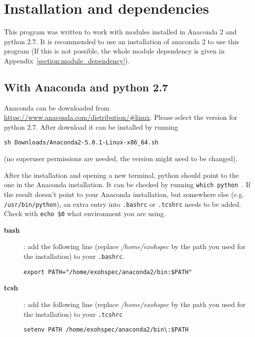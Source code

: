 \documentclass[10pt,a4paper]{article}
\begin{document}


\newpage
\section{Installation and dependencies}
\label{Section:installation}

\noindent This program was written to work with modules installed in Anaconda 2 and python 2.7. It is recommended to use an installation of anaconda 2 to use this program (If this is not possible, the whole module dependency is given in Appendix~\ref{section:module_dependency}).



\subsection{With Anaconda and python 2.7}

\noindent Anaconda can be downloaded from \url{https://www.anaconda.com/distribution/#linux}. Please select the version for python 2.7. After download it can be installed by running
\begin{lstlisting}[style=base]
sh Downloads/Anaconda2-5.0.1-Linux-x86_64.sh
\end{lstlisting}
(no superuser permissions are needed, the version might need to be changed).

After the installation and opening a new terminal, python should point to the one in the Anaconda installation. It can be checked by running \verb|which python|~. %
If the result doesn't point to your Anaconda installation, but somewhere else (e.g. \verb|/usr/bin/python|), an extra entry into \verb|.bashrc| or \verb|.tcshrc| needs to be added. Check with \verb|echo $0| what environment you are using.
\begin{description}
  \item[\textbf{bash}]: add the following line (replace \textit{/home/exohspec} by the path you used for the installation) to your \verb|.bashrc|. %
    \begin{lstlisting}[style=base]
export PATH="/home/exohspec/anaconda2/bin:$PATH"
    \end{lstlisting}
  \item[\textbf{tcsh}]: add the following line (replace \textit{/home/exohspec} by the path you used for the installation) to your \verb|.tcshrc|
    \begin{lstlisting}[style=base]
setenv PATH /home/exohspec/anaconda2/bin\:$PATH
    \end{lstlisting}
\end{description}
\end{document}
